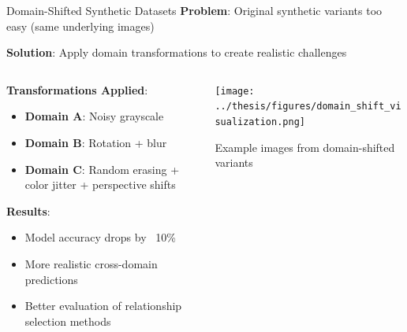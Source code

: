 \documentclass[aspectratio=169]{beamer}
\begin{document}
\begin{frame}{Domain-Shifted Synthetic Datasets}
    \textbf{Problem}: Original synthetic variants too easy (same underlying images)

    \vspace{0.5em}

    \textbf{Solution}: Apply domain transformations to create realistic challenges

    \begin{columns}[T]
        \begin{column}{0.6\textwidth}
            \textbf{Transformations Applied}:
            \begin{itemize}
                \item \textbf{Domain A}: Noisy grayscale
                \item \textbf{Domain B}: Rotation + blur
                \item \textbf{Domain C}: Random erasing + color jitter + perspective shifts
            \end{itemize}

            \vspace{1em}

            \textbf{Results}:
            \begin{itemize}
                \item Model accuracy drops by ~10\%
                \item More realistic cross-domain predictions
                \item Better evaluation of relationship selection methods
            \end{itemize}
        \end{column}

        \begin{column}{0.35\textwidth}
            \begin{center}
                \texttt{[image: ../thesis/figures/domain\_shift\_visualization.png]}
            \end{center}
            \small{Example images from domain-shifted variants}
        \end{column}
    \end{columns}
\end{frame}
\end{document}
